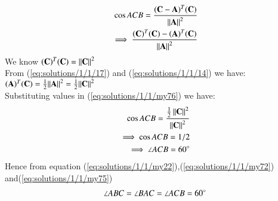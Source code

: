 \begin{align}\label{eq:solutions/1/1/my76}
     \cos{ACB} = \frac{(\mathbf{C-A})^T(\mathbf{C})}{\left\lVert\mathbf{A}\right\rVert^2}\nonumber\\
     \implies \frac{(\mathbf{C})^T(\mathbf{C})-(\mathbf{A})^T(\mathbf{C})}{\left\lVert\mathbf{A}\right\rVert^2}
\end{align}
We know $(\mathbf{C})^T (\mathbf{C})= {\left\lVert\mathbf{C}\right\rVert^2}$\\
From   (\ref{eq:solutions/1/1/17})  and (\ref{eq:solutions/1/1/14})  we have:\\
$(\mathbf{A})^T(\mathbf{C})= \frac{1}{2}{\left\lVert\mathbf{A}\right\rVert^2}=\frac{1}{2}{\left\lVert\mathbf{C}\right\rVert^2}$\\
Substituting values in (\ref{eq:solutions/1/1/my76}) we have:
\begin{align}
\cos {ACB}=
     \frac{{\frac{1}{2}\left\lVert\mathbf{C}\right\rVert^2}}{\left\lVert\mathbf{C}\right\rVert^2}\nonumber\\
     \implies \cos{ACB} = 1/2\nonumber\\
\implies \angle {ACB = 60} \degree
\end{align}
Hence from  equation (\ref{eq:solutions/1/1/my22}),(\ref{eq:solutions/1/1/my72}) and(\ref{eq:solutions/1/1/my75})
\begin{align}
\angle {ABC} =\angle {BAC}=\angle {ACB}=60\degree
    \end{align}

	
	
	
